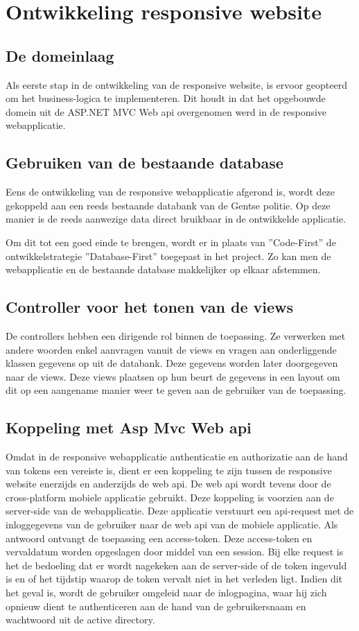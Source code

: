 \chapter{Ontwikkeling responsive website}
\label{ch:ontwikkelingresponsivewebsite}
\section{De domeinlaag}
Als eerste stap in de ontwikkeling van de responsive website, is ervoor geopteerd om het business-logica te implementeren.
Dit houdt in dat het opgebouwde domein uit de ASP.NET MVC Web api overgenomen werd in de responsive webapplicatie.

\section{Gebruiken van de bestaande database}
Eens de ontwikkeling van de responsive webapplicatie afgerond is, wordt deze gekoppeld aan een reeds bestaande databank van de Gentse politie.
Op deze manier is de reeds aanwezige data direct bruikbaar in de ontwikkelde applicatie.

Om dit tot een goed einde te brengen, wordt er in plaats van ''Code-First'' de ontwikkelstrategie ''Database-First'' toegepast in het project.
Zo kan men de webapplicatie en de bestaande database makkelijker op elkaar afstemmen.

\section{Controller voor het tonen van de views}
De controllers hebben een dirigende rol binnen de toepassing. Ze verwerken met andere woorden enkel aanvragen vanuit de views en vragen aan onderliggende
klassen gegevens op uit de databank. Deze gegevens worden later doorgegeven naar de views. Deze views plaatsen op hun beurt de gegevens in een layout om
dit op een aangename manier weer te geven aan de gebruiker van de toepassing.

\section{Koppeling met Asp Mvc Web api}
Omdat in de responsive webapplicatie authenticatie en authorizatie aan de hand van tokens een vereiste is,
dient er een koppeling te zijn tussen de responsive website enerzijds en anderzijds de web api. De web api wordt tevens door de cross-platform
mobiele applicatie gebruikt. Deze koppeling is voorzien aan de server-side van de webapplicatie. Deze applicatie verstuurt een api-request met
de inloggegevens van de gebruiker naar de web api van de mobiele applicatie. Als antwoord ontvangt de toepassing een access-token. Deze access-token en vervaldatum worden
opgeslagen door middel van een session. Bij elke request is het de bedoeling dat er wordt nagekeken aan de server-side of
de token ingevuld is en of het tijdstip waarop de token vervalt niet in het verleden ligt. Indien dit het geval is, wordt
de gebruiker omgeleid naar de inlogpagina, waar hij zich opnieuw dient te authenticeren aan de hand van de gebruikersnaam en
wachtwoord uit de active directory.

